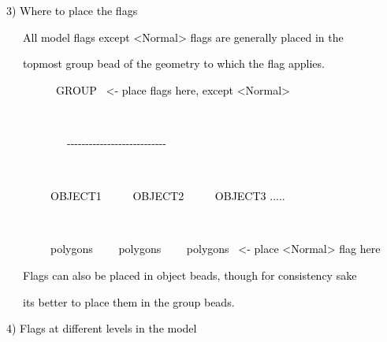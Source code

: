 \documentclass[a4paper]{article}
\newcommand\textstyleOOoComputerKeyWord[1]{\textrm{\textcolor[rgb]{0.0,0.0,0.5019608}{#1}}}
\begin{document}
\bigskip

{\color{black}
\textstyleOOoComputerKeyWord{\textcolor{black}{3) Where to place the flags}}}


\bigskip

{\color{black}
\textstyleOOoComputerKeyWord{\textcolor{black}{\ \ \ All model flags except {\textless}Normal{\textgreater} flags are
generally placed in the}}}

{\color{black}
\textstyleOOoComputerKeyWord{\textcolor{black}{\ \ \ topmost group bead of the geometry to which the flag applies.}}}


\bigskip

{\color{black}
\textstyleOOoComputerKeyWord{\textcolor{black}{\ \ \ \ \ \ \ \ \ GROUP \ {\textless}- place flags here, except
{\textless}Normal{\textgreater}}}}

{\color{black}
\textstyleOOoComputerKeyWord{\textcolor{black}{\ \ \ \ \ \ \ \ \ \ \ {\textbar}}}}

{\color{black}
\textstyleOOoComputerKeyWord{\textcolor{black}{\ \ \ \ \ \ \ \ \ \ \ {}-{}-{}-{}-{}-{}-{}-{}-{}-{}-{}-{}-{}-{}-{}-{}-{}-{}-{}-{}-{}-{}-{}-{}-{}-{}-{}-}}}

{\color{black}
\textstyleOOoComputerKeyWord{\textcolor{black}{\ \ \ \ \ \ \ \ \ \ \ {\textbar} \ \ \ \ \ \ \ \ \ \ \ {\textbar}
\ \ \ \ \ \ \ \ \ \ \ {\textbar}}}}

{\color{black}
\textstyleOOoComputerKeyWord{\textcolor{black}{\ \ \ \ \ \ \ \ OBJECT1 \ \ \ \ \ OBJECT2 \ \ \ \ \ OBJECT3 .....}}}

{\color{black}
\textstyleOOoComputerKeyWord{\textcolor{black}{\ \ \ \ \ \ \ \ \ \ \ {\textbar} \ \ \ \ \ \ \ \ \ \ \ {\textbar}
\ \ \ \ \ \ \ \ \ \ \ {\textbar}}}}

{\color{black}
\textstyleOOoComputerKeyWord{\textcolor{black}{\ \ \ \ \ \ \ \ polygons \ \ \ \ polygons \ \ \ \ polygons \ {\textless}-
place {\textless}Normal{\textgreater} flag here}}}


\bigskip

{\color{black}
\textstyleOOoComputerKeyWord{\textcolor{black}{\ \ \ Flags can also be placed in object beads, though for consistency
sake}}}

{\color{black}
\textstyleOOoComputerKeyWord{\textcolor{black}{\ \ \ its better to place them in the group beads.}}}


\bigskip

{\color{black}
\textstyleOOoComputerKeyWord{\textcolor{black}{4) Flags at different levels in the model}}}
\end{document}
